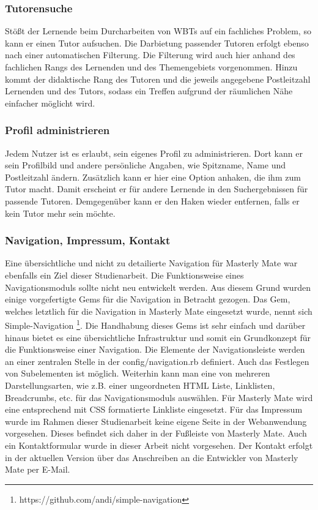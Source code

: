 \subsubsection{Tutorensuche}
Stößt der Lernende beim Durcharbeiten von WBTs auf ein fachliches Problem, so
kann er einen Tutor aufsuchen. Die Darbietung passender Tutoren erfolgt ebenso
nach einer automatischen Filterung. Die Filterung wird auch hier anhand des
fachlichen Rangs des Lernenden und des Themengebiets vorgenommen. Hinzu kommt
der didaktische Rang des Tutoren und die jeweils angegebene Postleitzahl
Lernenden und des Tutors, sodass ein Treffen aufgrund der räumlichen Nähe
einfacher möglicht wird.

\subsubsection{Profil administrieren}
Jedem Nutzer ist es erlaubt, sein eigenes Profil zu administrieren. Dort kann er
sein Profilbild und andere persönliche Angaben, wie Spitzname, Name und
Postleitzahl ändern. Zusätzlich kann er hier eine Option anhaken, die ihm zum
Tutor macht. Damit erscheint er für andere Lernende in den Suchergebnissen für
passende Tutoren. Demgegenüber kann er den Haken wieder entfernen, falls er kein
Tutor mehr sein möchte.

\subsubsection{Navigation, Impressum, Kontakt}
\begin{k}
Eine übersichtliche und nicht zu detailierte Navigation für Masterly Mate war
ebenfalls ein Ziel dieser Studienarbeit. Die Funktionsweise eines
Navigationsmoduls sollte nicht neu entwickelt werden. Aus diesem Grund wurden
einige vorgefertigte Gems für die Navigation in Betracht gezogen. Das Gem,
welches letztlich für die Navigation in Masterly Mate eingesetzt wurde, nennt
sich Simple-Navigation \footnote{https://github.com/andi/simple-navigation}. 
Die Handhabung dieses Gems ist sehr einfach und darüber hinaus bietet es eine
übersichtliche Infrastruktur und somit ein Grundkonzept für die Funktionsweise
einer Navigation. Die Elemente der Navigationsleiste werden an einer zentralen
Stelle in der config/navigation.rb definiert. Auch das Festlegen von
Subelementen ist möglich. Weiterhin kann man eine von mehreren 
Darstellungsarten, wie z.B. einer ungeordneten HTML Liste, Linklisten,
Breadcrumbs, etc. für das Navigationsmoduls auswählen. Für Masterly Mate wird
eine entsprechend mit CSS formatierte Linkliste eingesetzt.
Für das Impressum wurde im Rahmen dieser Studienarbeit keine eigene Seite in der
Webanwendung vorgesehen. Dieses befindet sich daher in der Fußleiste von
Masterly Mate. Auch ein Kontaktformular wurde in dieser Arbeit nicht vorgesehen.
Der Kontakt erfolgt in der aktuellen Version über das Anschreiben an die
Entwickler von Masterly Mate per E-Mail.
\end{k}

